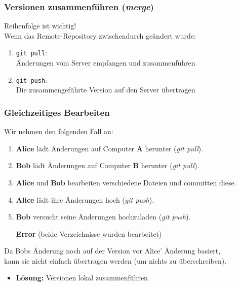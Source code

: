 \documentclass[accentcolor=tud8b,colorbacktitle,inverttitle,landscape,german,presentation,t]{tudbeamer}
\newcommand{\diffn}[1]{\textcolor{darkgreen}{#1}}
\begin{document}
\begin{frame}
			\end{frame}
		
			\begin{frame}
				\frametitle{Versionen zusammenführen (\textit{merge})}
				Reihenfolge ist wichtig!\\ Wenn das Remote-Repository zwischendurch geändert wurde:
				\begin{enumerate}
					\item \texttt{git pull}:\\Änderungen vom Server empfangen und zusammenführen
					\item \texttt{git push}:\\Die zusammengeführte Version auf den Server übertragen
				\end{enumerate}
			\end{frame}
	
			\begin{frame}
				\frametitle{Gleichzeitiges Bearbeiten}
				Wir nehmen den folgenden Fall an:
				\begin{enumerate}
					\item \textbf{Alice} lädt Änderungen auf Computer \textbf{A} herunter (\textit{git pull}).
					\pause
					\item \textbf{Bob} lädt Änderungen auf Computer \textbf{B} herunter (\textit{git pull}).
					\pause
					\item \textbf{Alice} und \textbf{Bob} bearbeiten verschiedene Dateien und committen diese.
					\pause
					\item \textbf{Alice} lädt ihre Änderungen hoch (\textit{git push}).
					\pause
					\item \textbf{Bob } versucht seine Änderungen hochzuladen (\textit{git push}).
					\pause
					\item [\textbf{Error}] (beide Verzeichnisse wurden bearbeitet)
				\end{enumerate}
				
				Da Bobs Änderung noch auf der Version vor Alice' Änderung basiert,\\
				kann sie nicht einfach übertragen werden (um nichts zu überschreiben).\\
				\begin{itemize}
					\item \textbf{Lösung:} Versionen lokal zusammenführen
				\end{itemize}
			\end{frame}
		
\end{document}
